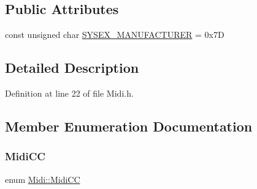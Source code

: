 \subsection*{Public Attributes}
\begin{DoxyCompactItemize}
\item 
const unsigned char \hyperlink{class_midi_aa4332beed702e57a3aeb00c0c831b9b0}{S\+Y\+S\+E\+X\+\_\+\+M\+A\+N\+U\+F\+A\+C\+T\+U\+R\+ER} = 0x7D
\end{DoxyCompactItemize}


\subsection{Detailed Description}


Definition at line 22 of file Midi.\+h.



\subsection{Member Enumeration Documentation}
\mbox{\label{class_midi_a0a4b2a9dceb6dd871c669d7ca3f6f5b9}} 
\subsubsection{\texorpdfstring{Midi\+CC}{MidiCC}}
{\footnotesize\ttfamily enum \hyperlink{class_midi_a0a4b2a9dceb6dd871c669d7ca3f6f5b9}{Midi\+::\+Midi\+CC}}


